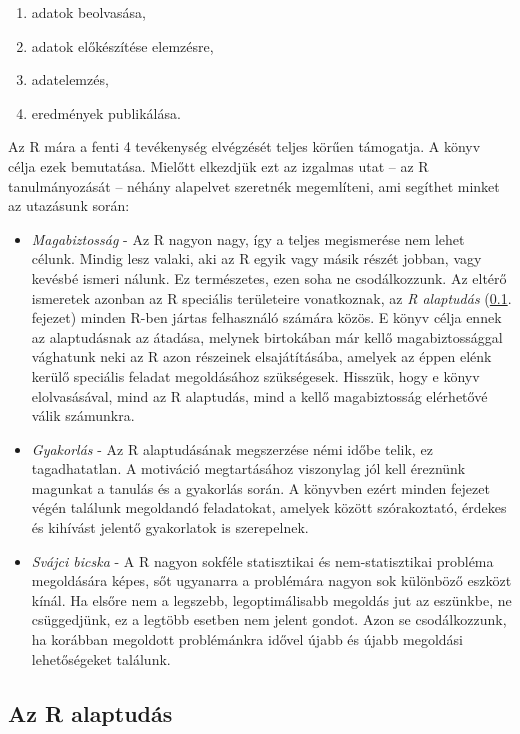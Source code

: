 \documentclass[
]{book}
\providecommand{\tightlist}{%
  \setlength{\itemsep}{0pt}\setlength{\parskip}{0pt}}
\begin{document}
\begin{enumerate}
\def\labelenumi{\arabic{enumi}.}
\tightlist
\item
  adatok beolvasása,
\item
  adatok előkészítése elemzésre,
\item
  adatelemzés,
\item
  eredmények publikálása.
\end{enumerate}

Az R mára a fenti 4 tevékenység elvégzését teljes körűen támogatja. A könyv célja ezek bemutatása. Mielőtt elkezdjük ezt az izgalmas utat -- az R tanulmányozását -- néhány alapelvet szeretnék megemlíteni, ami segíthet minket az utazásunk során:

\begin{itemize}
\tightlist
\item
  \emph{Magabiztosság} - Az R nagyon nagy, így a teljes megismerése nem lehet célunk. Mindig lesz valaki, aki az R egyik vagy másik részét jobban, vagy kevésbé ismeri nálunk. Ez természetes, ezen soha ne csodálkozzunk. Az eltérő ismeretek azonban az R speciális területeire vonatkoznak, az \emph{R alaptudás} (\ref{Ralaptudas}. fejezet) minden R-ben jártas felhasználó számára közös. E könyv célja ennek az alaptudásnak az átadása, melynek birtokában már kellő magabiztossággal vághatunk neki az R azon részeinek elsajátításába, amelyek az éppen elénk kerülő speciális feladat megoldásához szükségesek. Hisszük, hogy e könyv elolvasásával, mind az R alaptudás, mind a kellő magabiztosság elérhetővé válik számunkra.
\item
  \emph{Gyakorlás} - Az R alaptudásának megszerzése némi időbe telik, ez tagadhatatlan. A motiváció megtartásához viszonylag jól kell éreznünk magunkat a tanulás és a gyakorlás során. A könyvben ezért minden fejezet végén találunk megoldandó feladatokat, amelyek között szórakoztató, érdekes és kihívást jelentő gyakorlatok is szerepelnek.
\item
  \emph{Svájci bicska} - A R nagyon sokféle statisztikai és nem-statisztikai probléma megoldására képes, sőt ugyanarra a problémára nagyon sok különböző eszközt kínál. Ha elsőre nem a legszebb, legoptimálisabb megoldás jut az eszünkbe, ne csüggedjünk, ez a legtöbb esetben nem jelent gondot. Azon se csodálkozzunk, ha korábban megoldott problémánkra idővel újabb és újabb megoldási lehetőségeket találunk.
\end{itemize}

\hypertarget{Ralaptudas}{%
\subsection{Az R alaptudás}\label{Ralaptudas}}
\end{document}
